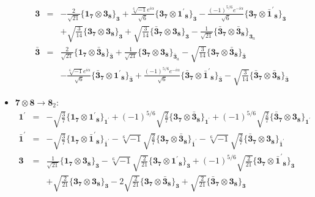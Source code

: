 \documentclass[english]{article}
\newcommand{\subcg}[3]{\big\{ {#1}\otimes{#2}\big\}^{}_{#3}}
\newcommand{\rep}[1]{\mathbf{#1}}
\begin{document}
\begin{itemize}
\begin{eqnarray*}
\\
\rep{3} &=& -\frac{2}{\sqrt{21}}\subcg{\rep{1}_{\rep{7}}}{\rep{3}_{\rep{8}}}{\rep{3}}+\frac{\sqrt[6]{-1} e^{i \alpha }}{\sqrt{6}}\subcg{\rep{3}_{\rep{7}}}{\rep{1^{\prime}}_{\rep{8}}}{\rep{3}}-\frac{(-1)^{5/6} e^{-i \alpha }}{\sqrt{6}}\subcg{\rep{3}_{\rep{7}}}{\rep{\bar{1}^{\prime}}_{\rep{8}}}{\rep{3}} \\ 
 & & +\sqrt{\frac{3}{14}}\subcg{\rep{3}_{\rep{7}}}{\rep{3}_{\rep{8}}}{\rep{3}}+\sqrt{\frac{3}{14}}\subcg{\rep{\bar{3}}_{\rep{7}}}{\rep{3}_{\rep{8}}}{\rep{3}}-\frac{1}{\sqrt{21}}\subcg{\rep{\bar{3}}_{\rep{7}}}{\rep{\bar{3}}_{\rep{8}}}{\rep{3}_{a}}
\\
\rep{\bar{3}} &=& \frac{2}{\sqrt{21}}\subcg{\rep{1}_{\rep{7}}}{\rep{\bar{3}}_{\rep{8}}}{\rep{\bar{3}}}+\frac{1}{\sqrt{21}}\subcg{\rep{3}_{\rep{7}}}{\rep{3}_{\rep{8}}}{\rep{\bar{3}}_{a}}-\sqrt{\frac{3}{14}}\subcg{\rep{3}_{\rep{7}}}{\rep{\bar{3}}_{\rep{8}}}{\rep{\bar{3}}} \\ 
 & & -\frac{\sqrt[6]{-1} e^{i \alpha }}{\sqrt{6}}\subcg{\rep{\bar{3}}_{\rep{7}}}{\rep{1^{\prime}}_{\rep{8}}}{\rep{\bar{3}}}+\frac{(-1)^{5/6} e^{-i \alpha }}{\sqrt{6}}\subcg{\rep{\bar{3}}_{\rep{7}}}{\rep{\bar{1}^{\prime}}_{\rep{8}}}{\rep{\bar{3}}}-\sqrt{\frac{3}{14}}\subcg{\rep{\bar{3}}_{\rep{7}}}{\rep{\bar{3}}_{\rep{8}}}{\rep{\bar{3}}}
\end{eqnarray*}
\item $\rep{7}\otimes\rep{8}\to\rep{8}_{2}$:
\begin{eqnarray*}
\rep{1^{\prime}} &=& -\sqrt{\frac{3}{7}}\subcg{\rep{1}_{\rep{7}}}{\rep{1^{\prime}}_{\rep{8}}}{\rep{1^{\prime}}}+(-1)^{5/6} \sqrt{\frac{2}{7}}\subcg{\rep{3}_{\rep{7}}}{\rep{\bar{3}}_{\rep{8}}}{\rep{1^{\prime}}}+(-1)^{5/6} \sqrt{\frac{2}{7}}\subcg{\rep{\bar{3}}_{\rep{7}}}{\rep{3}_{\rep{8}}}{\rep{1^{\prime}}}
\\
\rep{\bar{1}^{\prime}} &=& -\sqrt{\frac{3}{7}}\subcg{\rep{1}_{\rep{7}}}{\rep{\bar{1}^{\prime}}_{\rep{8}}}{\rep{\bar{1}^{\prime}}}-\sqrt[6]{-1} \sqrt{\frac{2}{7}}\subcg{\rep{3}_{\rep{7}}}{\rep{\bar{3}}_{\rep{8}}}{\rep{\bar{1}^{\prime}}}-\sqrt[6]{-1} \sqrt{\frac{2}{7}}\subcg{\rep{\bar{3}}_{\rep{7}}}{\rep{3}_{\rep{8}}}{\rep{\bar{1}^{\prime}}}
\\
\rep{3} &=& \frac{1}{\sqrt{21}}\subcg{\rep{1}_{\rep{7}}}{\rep{3}_{\rep{8}}}{\rep{3}}-\sqrt[6]{-1} \sqrt{\frac{2}{21}}\subcg{\rep{3}_{\rep{7}}}{\rep{1^{\prime}}_{\rep{8}}}{\rep{3}}+(-1)^{5/6} \sqrt{\frac{2}{21}}\subcg{\rep{3}_{\rep{7}}}{\rep{\bar{1}^{\prime}}_{\rep{8}}}{\rep{3}} \\ 
 & & +\sqrt{\frac{2}{21}}\subcg{\rep{3}_{\rep{7}}}{\rep{3}_{\rep{8}}}{\rep{3}}-2 \sqrt{\frac{2}{21}}\subcg{\rep{3}_{\rep{7}}}{\rep{\bar{3}}_{\rep{8}}}{\rep{3}}+\sqrt{\frac{2}{21}}\subcg{\rep{\bar{3}}_{\rep{7}}}{\rep{3}_{\rep{8}}}{\rep{3}} \\ 

\end{eqnarray*}
\end{itemize}
\end{document}
